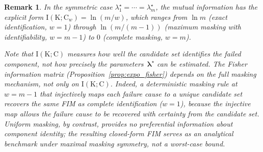 \documentclass[pdflatex,sn-mathphys-num,Numbered]{sn-jnl}
\newcommand{\RV}[1]{\mathrm{#1}}
\newcommand{\cand}{\RV{C}}         %
\newcommand{\tparam}[1]{{#1}^{\star}}  %
\renewcommand{\vec}[1]{\boldsymbol{#1}}
\theoremstyle{thmstyleone}
\theoremstyle{thmstylethree}
\theoremstyle{thmstyletwo}
\newtheorem{remark}[theorem]{Remark}
\begin{document}
\begin{remark}
In the symmetric case $\tparam{\lambda}_1 = \cdots = \tparam{\lambda}_m$, the mutual information has the explicit form $\RV{I}(\RV{K}; \cand_w) = \ln(m/w)$, which ranges from $\ln m$ (exact identification, $w=1$) through $\ln(m/(m-1))$ (maximum masking with identifiability, $w=m-1$) to $0$ (complete masking, $w=m$).

Note that $\RV{I}(\RV{K}; \cand)$ measures how well the candidate set identifies the \emph{failed component}, not how precisely the \emph{parameters}~$\tparam{\vec{\lambda}}$ can be estimated. The Fisher information matrix (Proposition~\ref{prop:expo_fisher}) depends on the full masking mechanism, not only on $\RV{I}(\RV{K}; \cand)$. Indeed, a deterministic masking rule at $w = m-1$ that injectively maps each failure cause to a unique candidate set recovers the same FIM as complete identification ($w = 1$), because the injective map allows the failure cause to be recovered with certainty from the candidate set. Uniform masking, by contrast, provides no preferential information about component identity; the resulting closed-form FIM serves as an analytical benchmark under maximal masking symmetry, not a worst-case bound.
\end{remark}
\end{document}
